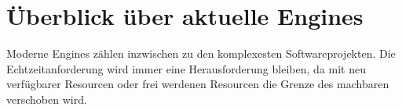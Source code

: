 \chapter{Überblick über aktuelle Engines}

Moderne Engines zählen inzwischen zu den komplexesten Softwareprojekten. Die Echtzeitanforderung wird immer eine Herausforderung bleiben, da mit neu verfügbarer Resourcen oder frei werdenen Resourcen die Grenze des machbaren verschoben wird.
